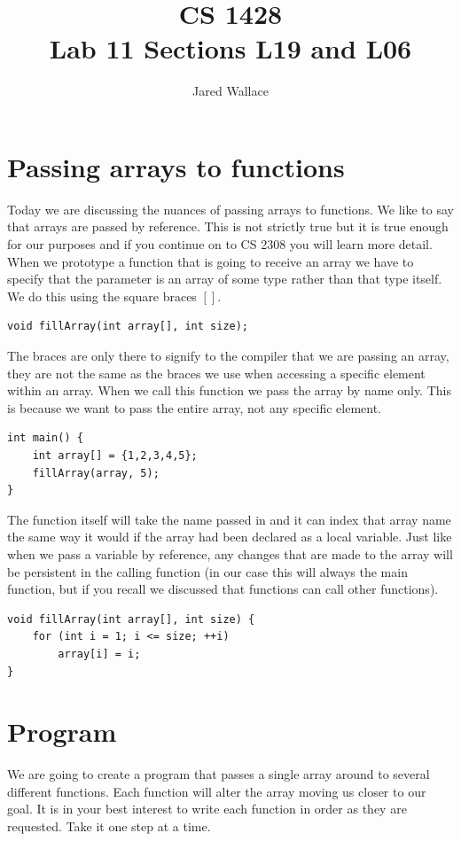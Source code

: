 \documentclass[letterpaper,12pt]{article}
\title{\Large CS 1428\\Lab 11 Sections L19 and L06}
\author{Jared Wallace}
\date{}
\begin{document}
\maketitle

\vspace{30mm}

\section*{Passing arrays to functions}
Today we are discussing the nuances of passing arrays to functions. We like to say
that arrays are passed by reference.  This is not strictly true but it is true enough
for our purposes and if you continue on to CS 2308 you will learn more detail. When 
we prototype a function that is going to receive an array we have to specify that the
parameter is an array of some type rather than that type itself.  We do this using the
square braces $[]$.

\begin{lstlisting}
void fillArray(int array[], int size);
\end{lstlisting}

The braces are only there to signify to the compiler that we are passing an array, 
they are not the same as the braces we use when accessing a specific element within
an array.  When we call this function we pass the array by name only. This is because 
we want to pass the entire array, not any specific element.

\begin{lstlisting}
int main() {
	int array[] = {1,2,3,4,5};
	fillArray(array, 5);
}
\end{lstlisting}

The function itself will take the name passed in and it can index that array name the
same way it would if the array had been declared as a local variable.  Just like when
we pass a variable by reference, any changes that are made to the array will be persistent
in the calling function (in our case this will always the main function, but if you recall
we discussed that functions can call other functions).

\begin{lstlisting}
void fillArray(int array[], int size) {
	for (int i = 1; i <= size; ++i)
		array[i] = i;
}
\end{lstlisting}

\section*{Program}
We are going to create a program that passes a single array around to several different
functions.  Each function will alter the array moving us closer to our goal. It is in
your best interest to write each function in order as they are requested.  Take it one
step at a time.
\end{document}
